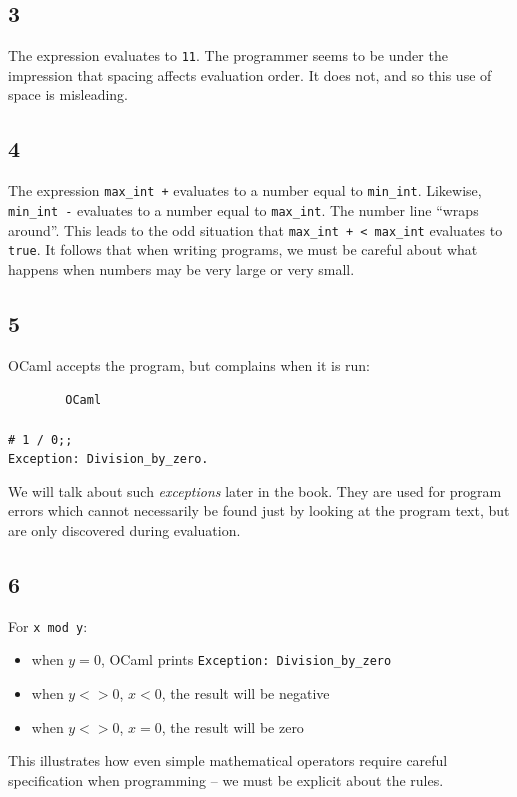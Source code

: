 \documentclass[]{book}
\newcommand{\smspace}{\vspace{4mm}}
\begin{document}
\subsection*{3}
The expression evaluates to \texttt{11}. The programmer seems to be under the  impression that spacing affects evaluation order. It does not, and so this use of space is misleading.

\subsection*{4}
The expression \texttt{max\_int\! +} evaluates to a number equal to \texttt{min\_int}. Likewise, \texttt{min\_int\! -} evaluates to a number equal to \texttt{max\_int}. The number line ``wraps around''. This leads to the odd situation that \texttt{max\_int\! +\! <\! max\_int} evaluates to \texttt{true}. It follows that when writing programs, we must be careful about what happens when numbers may be very large or very small.

\subsection*{5}
OCaml accepts the program, but complains when it is run:

\smspace
\noindent\verb!        OCaml!\\
\noindent\\
\noindent\verb!# 1 / 0;;!\\
\noindent\texttt{Exception:\ Division\_by\_zero.}
\smspace

\noindent We will talk about such \textit{exceptions} later in the book. They are used for program errors which cannot necessarily be found just by looking at the program text, but are only discovered during evaluation.

\subsection*{6}
For \texttt{x\! mod\! y}:
  \begin{itemize}
    \item[] when $y = 0$, OCaml prints \texttt{Exception:\ Division\_by\_zero}
    \item[] when $y <> 0$, $x < 0$, the result will be negative
    \item[] when $y <> 0$, $x = 0$, the result will be zero
  \end{itemize}
This illustrates how even simple mathematical operators require careful specification when programming -- we must be explicit about the rules.
\end{document}
